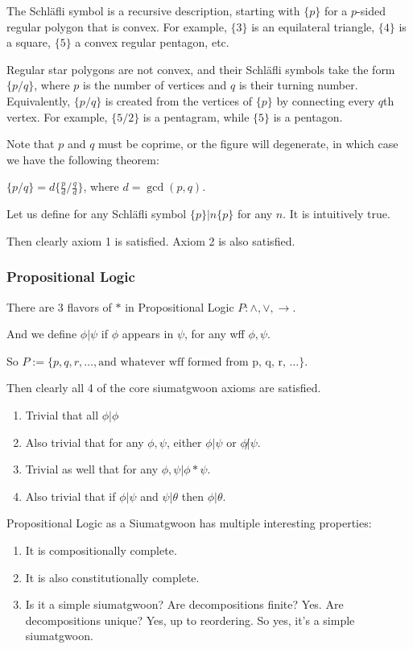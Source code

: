 The Schläfli symbol is a recursive description, starting with $\{p\}$ for a $p$-sided regular polygon that is convex. For example, $\{3\}$ is an equilateral triangle, $\{4\}$ is a square, $\{5\}$ a convex regular pentagon, etc.

Regular star polygons are not convex, and their Schläfli symbols take the form $\{p/q\}$, where $p$ is the number of vertices and $q$ is their turning number. Equivalently, $\{p/q\}$ is created from the vertices of $\{p\}$ by connecting every $q$th vertex. For example, $\{5/2\}$ is a pentagram, while $\{5\}$ is a pentagon.

Note that $p$ and $q$ must be coprime, or the figure will degenerate, in which case we have the following theorem:

$\{p/q\}=d\{ \frac{p}{d} / \frac{q}{d} \}$, where $d=\gcd(p,q)$.

Let us define for any Schläfli symbol $\{p\} | n\{p\}$ for any $n$. It is intuitively true.

Then clearly axiom 1 is satisfied. Axiom 2 is also satisfied.

\subsubsection{Propositional Logic}

There are 3 flavors of $*$ in Propositional Logic $P: \wedge, \vee, \rightarrow$. 

And we define $\phi | \psi$ if $\phi$ appears in $\psi$, for any wff $\phi, \psi$.

So $P := \{ p, q, r, \ldots, \text{and whatever wff formed from p, q, r, \ldots} \}$.

Then clearly all 4 of the core siumatgwoon axioms are satisfied. 

\begin{enumerate}
\item Trivial that all $\phi | \phi$
\item Also trivial that for any $\phi, \psi$, either $\phi|\psi$ or $\phi\not|\psi$.
\item Trivial as well that for any $\phi,\psi | \phi * \psi$.
\item Also trivial that if $\phi | \psi$ and $\psi | \theta$ then $\phi | \theta$.
\end{enumerate}

Propositional Logic as a Siumatgwoon has multiple interesting properties: 

\begin{enumerate}
\item It is compositionally complete. 
\item It is also constitutionally complete. 
\item Is it a simple siumatgwoon? Are decompositions finite? Yes. Are decompositions unique? Yes, up to reordering. So yes, it's a simple siumatgwoon.
\end{enumerate}

